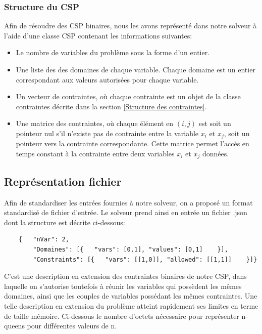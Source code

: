 \documentclass[14pt]{article}
\begin{document}
\subsubsection{Structure du CSP}

Afin de résoudre des CSP binaires, nous les avons représenté dans notre solveur à l'aide d'une classe CSP contenant les informations suivantes:

\begin{itemize}
    \item Le nombre de variables du problème sous la forme d'un entier.
    \item Une liste des des domaines de chaque variable. Chaque domaine est un entier correspondant aux valeurs autorisées pour chaque variable.
    \item Un vecteur de contraintes, où chaque contrainte est un objet de la classe contraintes décrite dans la section \ref{Structure des contraintes}.
    \item Une matrice des contraintes, où chaque élément en $(i,j)$ est soit un pointeur nul s'il n'existe pas de contrainte entre la variable $x_i$ et $x_j$, soit un pointeur vers la contrainte correspondante. Cette matrice permet l'accès en temps constant à la contrainte entre deux variables $x_i$ et $x_j$ données.
\end{itemize}

\subsection{Représentation fichier}

Afin de standardiser les entrées fournies à notre solveur, on a proposé un format standardisé de fichier d'entrée. Le solveur prend ainsi en entrée un fichier .json dont la structure est décrite ci-dessous:

\begin{verbatim}
	{   "nVar": 2,
	    "Domaines": [{   "vars": [0,1], "values": [0,1]    }],
	    "Constraints": [{   "vars": [[1,0]], "allowed": [[1,1]]    }]}
\end{verbatim}

C'est une description en extension des contraintes binaires de notre CSP, dans laquelle on s'autorise toutefois à réunir les variables qui possèdent les mêmes domaines, ainsi que les couples de variables possédant les mêmes contraintes. Une telle description en extension du problème atteint rapidement ses limites en terme de taille mémoire. Ci-dessous le nombre d'octets nécessaire pour représenter n-queens pour différentes valeurs de n.
\end{document}
